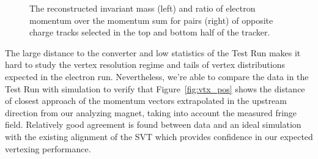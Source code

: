 \begin{figure}[ht]
\caption{\small{The reconstructed invariant mass (left) and ratio of electron momentum over the momentum sum for pairs (right) of opposite charge tracks selected in the top and bottom half of the tracker.}}
\label{fig:pair_kin}
\end{figure}

The large distance to the converter and low statistics of the Test Run makes it hard to study the vertex resolution regime and tails of vertex distributions expected in the electron run. Nevertheless, we're able to compare the data in the Test Run with simulation to verify that 
 Figure~\ref{fig:vtx_pos} shows the distance of closest approach of the momentum vectors extrapolated in the upstream direction from our analyzing magnet, taking into account the measured fringe field. Relatively good agreement is found between data and an ideal simulation with the existing alignment of the SVT which provides confidence in our expected vertexing performance. 
